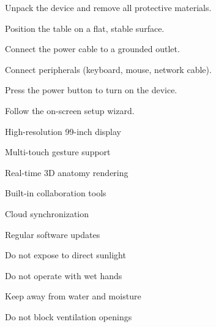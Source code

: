 \documentclass[11pt,a4paper]{article}
\begin{document}
\begin{tbkSteps}[prefix=Step]
  \item Unpack the device and remove all protective materials.
  \item Position the table on a flat, stable surface.
  \item Connect the power cable to a grounded outlet.
  \item Connect peripherals (keyboard, mouse, network cable).
  \item Press the power button to turn on the device.
  \item Follow the on-screen setup wizard.
\end{tbkSteps}


\begin{tbkFeatureList}
  \item High-resolution 99-inch display
  \item Multi-touch gesture support
  \item Real-time 3D anatomy rendering
  \item Built-in collaboration tools
  \item Cloud synchronization
  \item Regular software updates
\end{tbkFeatureList}


\begin{tbkChecklist}
\end{tbkChecklist}


\begin{tbkWarningList}
  \item Do not expose to direct sunlight
  \item Do not operate with wet hands
  \item Keep away from water and moisture
  \item Do not block ventilation openings
\end{tbkWarningList}

\end{document}
